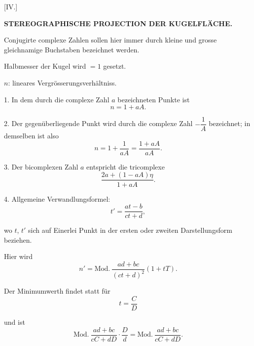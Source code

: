 
\begin{center}
[IV.]
\end{center}

\begin{center}
\bfseries STEREOGRAPHISCHE PROJECTION DER KUGELFLÄCHE.
\end{center}

Conjugirte complexe Zahlen sollen hier immer durch kleine und grosse gleichnamige Buchstaben bezeichnet werden.

Halbmesser der Kugel wird $=1$ gesetzt.

$n$: lineares Vergrösserungsverhältniss.

1. In dem durch die complexe Zahl $a$ bezeichneten Punkte ist
\[
n = 1+aA.
\]

2. Der gegenüberliegende Punkt wird durch die complexe Zahl $-\dfrac{1}{A}$ bezeichnet; in demselben ist also
\[
n = 1+\frac{1}{aA} = \frac{1+aA}{aA}.
\]

3. Der bicomplexen Zahl $a$ entspricht die tricomplexe
\[
\frac{2a+(1-aA)\eta}{1+aA}.
\]

4. Allgemeine Verwandlungsformel:
\[
t' = \frac{at-b}{ct+d},
\]

wo $t$, $t'$ sich auf Einerlei Punkt in der ersten oder zweiten Darstellungsform beziehen.

Hier wird
\[
n' = \text{Mod.}\ \frac{ad+bc}{(ct+d)^2}(1+tT).
\]

Der Minimumwerth findet statt für
\[
t = \frac{C}{D}
\]

\noindent und ist
\[
\text{Mod.}\ \frac{ad+bc}{cC+dD}\cdot\frac{D}{d} = \text{Mod.}\ \frac{ad+bc}{cC+dD}.
\]
